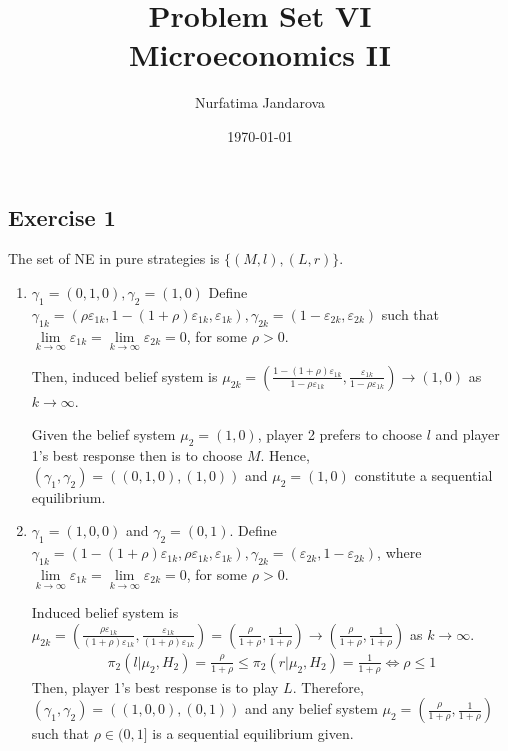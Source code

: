 \documentclass[]{article}
\title{Problem Set VI \\ \large Microeconomics II}
\author{Nurfatima Jandarova}
\date{\today}
\begin{document}
\maketitle

\subsection*{Exercise 1}

The set of NE in pure strategies is $\{(M, l), (L, r)\}$.

\begin{enumerate}
	\item $\gamma_1 = (0, 1, 0), \gamma_2 = (1, 0)$
	Define $\gamma_{1k} = (\rho\varepsilon_{1k}, 1 - (1 + \rho)\varepsilon_{1k}, \varepsilon_{1k}), \gamma_{2k} = (1 - \varepsilon_{2k}, \varepsilon_{2k})$ such that $\lim\limits_{k\to\infty}\varepsilon_{1k} = \lim\limits_{k\to\infty}\varepsilon_{2k} = 0$, for some $\rho > 0$.
	
	Then, induced belief system is $\mu_{2k} = (\frac{1 - (1 + \rho)\varepsilon_{1k}}{1 - \rho\varepsilon_{1k}}, \frac{\varepsilon_{1k}}{1 - \rho\varepsilon_{1k}}) \to (1, 0)$ as $k\to\infty$.
	
	Given the belief system $\mu_2 = (1, 0)$, player 2 prefers to choose $l$ and player 1's best response then is to choose $M$. Hence, $(\gamma_1, \gamma_2) = ((0, 1, 0), (1, 0))$ and $\mu_2 = (1, 0)$ constitute a sequential equilibrium.
	
	\item $\gamma_1 = (1, 0, 0)$ and $\gamma_2 = (0, 1)$. Define $\gamma_{1k} = (1 - (1 + \rho)\varepsilon_{1k}, \rho\varepsilon_{1k}, \varepsilon_{1k}), \gamma_{2k} = (\varepsilon_{2k}, 1 - \varepsilon_{2k})$, where $\lim\limits_{k\to\infty}\varepsilon_{1k} = \lim\limits_{k\to\infty}\varepsilon_{2k} = 0$, for some $\rho > 0$.
	
	Induced belief system is $\mu_{2k} = (\frac{\rho\varepsilon_{1k}}{(1 + \rho)\varepsilon_{1k}}, \frac{\varepsilon_{1k}}{(1 + \rho)\varepsilon_{1k}}) = (\frac{\rho}{1 + \rho}, \frac{1}{1 + \rho}) \to (\frac{\rho}{1 + \rho}, \frac{1}{1 + \rho})$ as $k\to\infty$.
	\begin{equation}
		\begin{split}
			\pi_2(l|\mu_2, H_2) = \frac{\rho}{1 + \rho} \leq \pi_2(r|\mu_2, H_2) = \frac{1}{1 + \rho} \iff \rho\leq 1 \nonumber
		\end{split}
	\end{equation}
	Then, player 1's best response is to play $L$. Therefore, $(\gamma_1, \gamma_2) = ((1, 0, 0), (0, 1))$ and any belief system $\mu_2 = (\frac{\rho}{1 + \rho}, \frac{1}{1 + \rho})$ such that $\rho\in(0, 1]$ is a sequential equilibrium given.
	

\end{enumerate}
\end{document}
